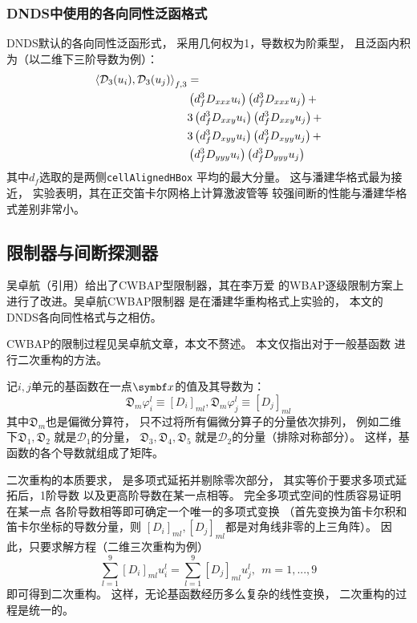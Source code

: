 \documentclass[UTF8,zihao=5]{ctexart} %
\begin{document}
\subsubsection{DNDS中使用的各向同性泛函格式}

DNDS默认的各向同性泛函形式，
采用几何权为1，导数权为阶乘型，
且泛函内积为（以二维下三阶导数为例）：
$$
    \begin{aligned}
        \left\langle\mathcal{D}_3(u_i),\mathcal{D}_3(u_j)\right\rangle_{f,3}
         & = \\
         &
        \left(d_f^3 D_{xxx}u_i\right)
        \left(d_f^3 D_{xxx}u_j\right)
        +    \\
         &
        3
        \left(d_f^3 D_{xxy}u_i\right)
        \left(d_f^3 D_{xxy}u_j\right)
        +    \\
         &
        3
        \left(d_f^3 D_{xyy}u_i\right)
        \left(d_f^3 D_{xyy}u_j\right)
        +    \\
         &
        \left(d_f^3 D_{yyy}u_i\right)
        \left(d_f^3 D_{yyy}u_j\right)
    \end{aligned}
$$
其中$d_f$选取的是两侧\verb|cellAlignedHBox|
平均的最大分量。
这与潘建华格式最为接近，
实验表明，其在正交笛卡尔网格上计算激波管等
较强间断的性能与潘建华格式差别非常小。

\subsection{限制器与间断探测器}

吴卓航（引用）给出了CWBAP型限制器，其在李万爱\cite{li2011multi,li2012multi}
的WBAP逐级限制方案上进行了改进。吴卓航CWBAP限制器
是在潘建华重构格式上实验的，
本文的DNDS各向同性格式与之相仿。

CWBAP的限制过程见吴卓航文章，本文不赘述。
本文仅指出对于一般基函数
进行二次重构的方法。

记$i,j$单元的基函数在一点$\x$的值及其导数为：
$$
    \mathfrak{D}_m{\varphi_i^l}\equiv [D_i]_{ml}
    , \mathfrak{D}_m{\varphi_j^l}\equiv [D_j]_{ml}
$$
其中$\mathfrak{D}_m$也是偏微分算符，
只不过将所有偏微分算子的分量依次排列，
例如二维下$\mathfrak{D}_1,\mathfrak{D}_2$
就是$\mathcal{D}_1$的分量，
$\mathfrak{D}_3,\mathfrak{D}_4,\mathfrak{D}_5$
就是$\mathcal{D}_2$的分量（排除对称部分）。
这样，基函数的各个导数就组成了矩阵。

二次重构的本质要求，
是多项式延拓并剔除零次部分，
其实等价于要求多项式延拓后，1阶导数
以及更高阶导数在某一点相等。
完全多项式空间的性质容易证明在某一点
各阶导数相等即可确定一个唯一的多项式变换
（首先变换为笛卡尔积和笛卡尔坐标的导数分量，则
$[D_i]_{ml},[D_j]_{ml}$都是对角线非零的上三角阵）。
因此，只要求解方程（二维三次重构为例）
$$
    \sum_{l=1}^{9}[D_i]_{ml}u_i^l =
    \sum_{l=1}^{9}[D_j]_{ml}u_j^l, \ \ m=1,...,9
$$
即可得到二次重构。
这样，无论基函数经历多么复杂的线性变换，
二次重构的过程是统一的。
\end{document}
